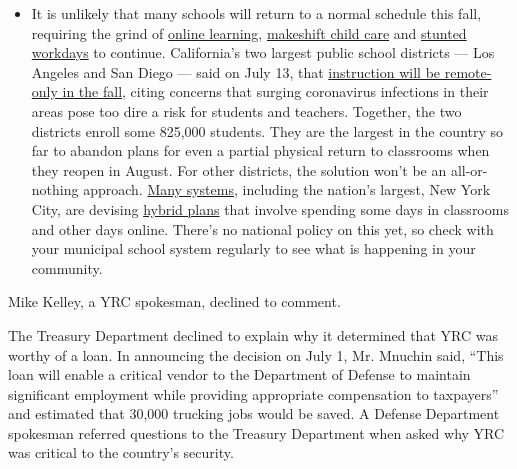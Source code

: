 \begin{itemize}
  \begin{itemize}
  \tightlist
  \item
    It is unlikely that many schools will return to a normal schedule
    this fall, requiring the grind of
    \href{https://www.nytimes.com/2020/06/05/us/coronavirus-education-lost-learning.html?action=click\&pgtype=Article\&state=default\&region=MAIN_CONTENT_3\&context=storylines_faq}{online
    learning},
    \href{https://www.nytimes.com/2020/05/29/us/coronavirus-child-care-centers.html?action=click\&pgtype=Article\&state=default\&region=MAIN_CONTENT_3\&context=storylines_faq}{makeshift
    child care} and
    \href{https://www.nytimes.com/2020/06/03/business/economy/coronavirus-working-women.html?action=click\&pgtype=Article\&state=default\&region=MAIN_CONTENT_3\&context=storylines_faq}{stunted
    workdays} to continue. California's two largest public school
    districts --- Los Angeles and San Diego --- said on July 13, that
    \href{https://www.nytimes.com/2020/07/13/us/lausd-san-diego-school-reopening.html?action=click\&pgtype=Article\&state=default\&region=MAIN_CONTENT_3\&context=storylines_faq}{instruction
    will be remote-only in the fall}, citing concerns that surging
    coronavirus infections in their areas pose too dire a risk for
    students and teachers. Together, the two districts enroll some
    825,000 students. They are the largest in the country so far to
    abandon plans for even a partial physical return to classrooms when
    they reopen in August. For other districts, the solution won't be an
    all-or-nothing approach.
    \href{https://bioethics.jhu.edu/research-and-outreach/projects/eschool-initiative/school-policy-tracker/}{Many
    systems}, including the nation's largest, New York City, are
    devising
    \href{https://www.nytimes.com/2020/06/26/us/coronavirus-schools-reopen-fall.html?action=click\&pgtype=Article\&state=default\&region=MAIN_CONTENT_3\&context=storylines_faq}{hybrid
    plans} that involve spending some days in classrooms and other days
    online. There's no national policy on this yet, so check with your
    municipal school system regularly to see what is happening in your
    community.
  \end{itemize}
\end{itemize}

Mike Kelley, a YRC spokesman, declined to comment.

The Treasury Department declined to explain why it determined that YRC
was worthy of a loan. In announcing the decision on July 1, Mr. Mnuchin
said, ``This loan will enable a critical vendor to the Department of
Defense to maintain significant employment while providing appropriate
compensation to taxpayers'' and estimated that 30,000 trucking jobs
would be saved. A Defense Department spokesman referred questions to the
Treasury Department when asked why YRC was critical to the country's
security.

